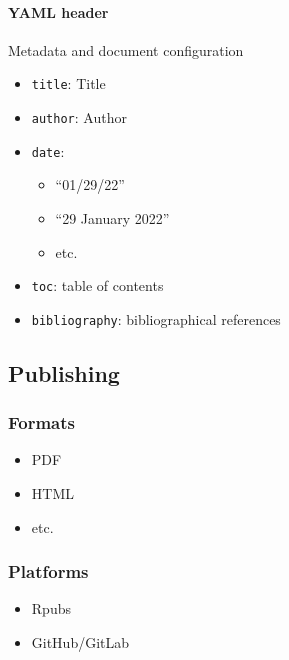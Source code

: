 \documentclass[
]{article}
\providecommand{\tightlist}{%
  \setlength{\itemsep}{0pt}\setlength{\parskip}{0pt}}
\begin{document}
\hypertarget{yaml}{%
\paragraph{YAML header}\label{yaml}}

Metadata and document configuration

\begin{itemize}
\item
  \texttt{title}: Title
\item
  \texttt{author}: Author
\item
  \texttt{date}:

  \begin{itemize}
  \tightlist
  \item
    ``01/29/22''
  \item
    ``29 January 2022''
  \item
    etc.
  \end{itemize}
\item
  \texttt{toc}: table of contents
\item
  \texttt{bibliography}: bibliographical references
\end{itemize}

\hypertarget{publishing}{%
\subsection{Publishing}\label{publishing}}

\hypertarget{formats}{%
\subsubsection{Formats}\label{formats}}

\begin{itemize}
\item
  PDF
\item
  HTML
\item
  etc.
\end{itemize}

\hypertarget{platforms}{%
\subsubsection{Platforms}\label{platforms}}

\begin{itemize}
\item
  Rpubs
\item
  GitHub/GitLab
\end{itemize}
\end{document}
